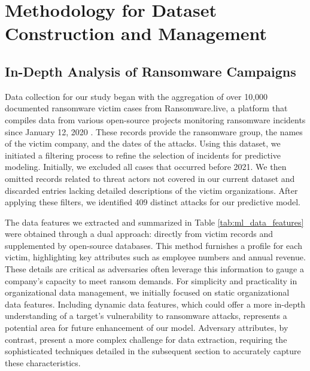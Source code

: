 \documentclass[running heads]{llncs}
\begin{document}
\section{Methodology for Dataset Construction and Management}
\label{sec:datamanagement}

\subsection{In-Depth Analysis of Ransomware Campaigns}
Data collection for our study began with the aggregation of over 10,000 documented ransomware victim cases from Ransomware.live, a platform that compiles data from various open-source projects monitoring ransomware incidents since January 12, 2020 \cite{Ransomware:Live}. These records provide the ransomware group, the names of the victim company, and the dates of the attacks. Using this dataset, we initiated a filtering process to refine the selection of incidents for predictive modeling. Initially, we excluded all cases that occurred before 2021. We then omitted records related to threat actors not covered in our current dataset and discarded entries lacking detailed descriptions of the victim organizations. After applying these filters, we identified 409 distinct attacks for our predictive model.

The data features we extracted and summarized in Table \ref{tab:ml_data_features} were obtained through a dual approach: directly from victim records and supplemented by open-source databases. This method furnishes a profile for each victim, highlighting key attributes such as employee numbers and annual revenue. These details are critical as adversaries often leverage this information to gauge a company's capacity to meet ransom demands. For simplicity and practicality in organizational data management, we initially focused on static organizational data features. Including dynamic data features, which could offer a more in-depth understanding of a target's vulnerability to ransomware attacks, represents a potential area for future enhancement of our model. Adversary attributes, by contrast, present a more complex challenge for data extraction, requiring the sophisticated techniques detailed in the subsequent section to accurately capture these characteristics. 
\end{document}
